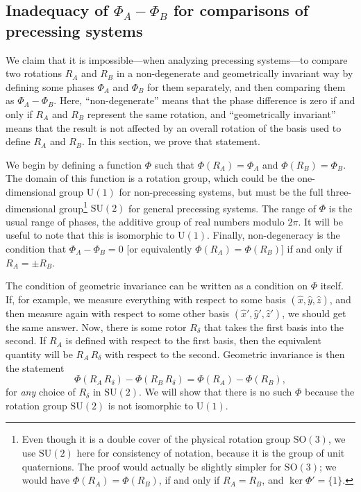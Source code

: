\documentclass[aps,prd,amsmath,floatfix,twocolumn,superscriptaddress,nofootinbib,showpacs]{revtex4-1}
\newcommand{\U}{\ensuremath{\mathrm{U}}}
\newcommand{\SU}{\ensuremath{\mathrm{SU}}}
\newcommand{\SO}{\ensuremath{\mathrm{SO}}}
\begin{document}
\subsection{Inadequacy of \texorpdfstring{$\Phi_A-\Phi_B$}{PhiA-PhiB}
  for comparisons of precessing  systems}
\label{sec:InadequacyOfSeparatePhases}

We claim that it is impossible---when analyzing precessing
systems---to compare two rotations $R_{A}$ and $R_{B}$ in a
non-degenerate and geometrically invariant way by defining some
phases $\Phi_{A}$ and $\Phi_{B}$ for them separately, and then
comparing them as $\Phi_{A}-\Phi_{B}$.  Here, ``non-degenerate''
  means that the phase difference is zero if and only if $R_{A}$ and
  $R_{B}$ represent the same rotation, and ``geometrically invariant''
  means that the result is not affected by an overall rotation of the
  basis used to define $R_{A}$ and $R_{B}$.  In this section, we
prove that statement.

We begin by defining a function $\Phi$ such that $\Phi(R_A) = \Phi_A$
and $\Phi(R_B) = \Phi_B$.  The domain of this function is a rotation
group, which could be the one-dimensional group $\U(1)$ for
non-precessing systems, but must be the full three-dimensional
group\footnote{Even though it is a double cover of the physical
  rotation group $\SO(3)$, we use $\SU(2)$ here for consistency of
  notation, because it is the group of unit quaternions.  The proof
  would actually be slightly simpler for $\SO(3)$; we would have
  $\Phi(R_{A}) = \Phi(R_{B})$, if and only if $R_{A} = R_{B}$, and
  $\ker\Phi' = \{1\}$.}  $\SU(2)$ for general precessing systems.  The
range of $\Phi$ is the usual range of phases, the additive group of
real numbers modulo $2\pi$.  It will be useful to note that this is
isomorphic to $\U(1)$.  Finally, non-degeneracy is the condition
that $\Phi_{A}-\Phi_{B} = 0$ [or equivalently $\Phi(R_{A}) =
\Phi(R_{B})$] if and only if $R_{A} = \pm R_{B}$.

The condition of geometric invariance can be written as a condition on
$\Phi$ itself.  If, for example, we measure everything with respect to
some basis $(\hat{x}, \hat{y}, \hat{z})$, and then measure again with
respect to some other basis $(\hat{x}', \hat{y}', \hat{z}')$, we
should get the same answer.  Now, there is some rotor $R_{\delta}$
that takes the first basis into the second.  If $R_{A}$ is defined
with respect to the first basis, then the equivalent quantity will be
$R_{A}\, R_{\delta}$ with respect to the second.  Geometric invariance
is then the statement
\begin{equation}
  \label{eq:GeometricInvariance}
  \Phi(R_{A}\, R_{\delta}) - \Phi(R_{B}\, R_{\delta}) = \Phi(R_{A}) -
  \Phi(R_{B}),
\end{equation}
for \emph{any} choice of $R_{\delta}$ in $\SU(2)$.  We will show that
there is no such $\Phi$ because the rotation group $\SU(2)$ is not
isomorphic to $\U(1)$.
\end{document}
